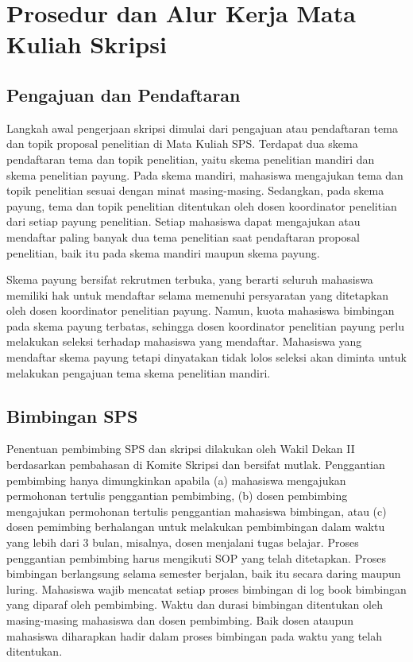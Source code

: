\documentclass[
  indonesian,
  letterpaper,
]{scrbook}
\begin{document}
\section{Prosedur dan Alur Kerja Mata Kuliah
Skripsi}\label{prosedur-dan-alur-kerja-mata-kuliah-skripsi}

\subsection*{Pengajuan dan Pendaftaran}\label{pengajuan-dan-pendaftaran}

Langkah awal pengerjaan skripsi dimulai dari pengajuan atau pendaftaran
tema dan topik proposal penelitian di Mata Kuliah SPS. Terdapat dua
skema pendaftaran tema dan topik penelitian, yaitu skema penelitian
mandiri dan skema penelitian payung. Pada skema mandiri, mahasiswa
mengajukan tema dan topik penelitian sesuai dengan minat masing-masing.
Sedangkan, pada skema payung, tema dan topik penelitian ditentukan oleh
dosen koordinator penelitian dari setiap payung penelitian. Setiap
mahasiswa dapat mengajukan atau mendaftar paling banyak dua tema
penelitian saat pendaftaran proposal penelitian, baik itu pada skema
mandiri maupun skema payung.

Skema payung bersifat rekrutmen terbuka, yang berarti seluruh mahasiswa
memiliki hak untuk mendaftar selama memenuhi persyaratan yang ditetapkan
oleh dosen koordinator penelitian payung. Namun, kuota mahasiswa
bimbingan pada skema payung terbatas, sehingga dosen koordinator
penelitian payung perlu melakukan seleksi terhadap mahasiswa yang
mendaftar. Mahasiswa yang mendaftar skema payung tetapi dinyatakan tidak
lolos seleksi akan diminta untuk melakukan pengajuan tema skema
penelitian mandiri.

\subsection*{Bimbingan SPS}\label{bimbingan-sps}

Penentuan pembimbing SPS dan skripsi dilakukan oleh Wakil Dekan II
berdasarkan pembahasan di Komite Skripsi dan bersifat mutlak.
Penggantian pembimbing hanya dimungkinkan apabila (a) mahasiswa
mengajukan permohonan tertulis penggantian pembimbing, (b) dosen
pembimbing mengajukan permohonan tertulis penggantian mahasiswa
bimbingan, atau (c) dosen pemimbing berhalangan untuk melakukan
pembimbingan dalam waktu yang lebih dari 3 bulan, misalnya, dosen
menjalani tugas belajar. Proses penggantian pembimbing harus mengikuti
SOP yang telah ditetapkan. Proses bimbingan berlangsung selama semester
berjalan, baik itu secara daring maupun luring. Mahasiswa wajib mencatat
setiap proses bimbingan di log book bimbingan yang diparaf oleh
pembimbing. Waktu dan durasi bimbingan ditentukan oleh masing-masing
mahasiswa dan dosen pembimbing. Baik dosen ataupun mahasiswa diharapkan
hadir dalam proses bimbingan pada waktu yang telah ditentukan.
\end{document}
